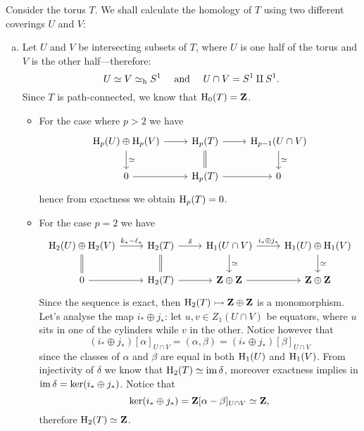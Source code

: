 \begin{example}[Torus]
\label{exp:torus-homology}
Consider the torus \(T\). We shall calculate the homology of \(T\) using two
different coverings \(U\) and \(V\):
\begin{enumerate}[(a)]\setlength\itemsep{0em}
\item Let \(U\) and \(V\) be intersecting subsets of \(T\), where \(U\) is one
  half of the torus and \(V\) is the other half---therefore:
  \[
  U \simeq V \simeq_{\text{h}} S^1 \quad \text{ and } \quad U \cap V = S^1 \amalg S^1.
  \]
  Since \(T\) is path-connected, we know that \(\operatorname{H}_0(T) = \mathbf{Z}\).
  \begin{itemize}\setlength\itemsep{0em}
\item For the case where \(p > 2\) we have
  \[
  \begin{tikzcd}
  \Hmlg_p(U) \oplus \Hmlg_p(V) \ar[d, "\dis"]
  \ar[r]
  &\Hmlg_p(T) \ar[d, equals]
  \ar[r]
  &\Hmlg_{p-1}(U \cap V) \ar[d, "\dis"]
  \\
  0 \ar[r] &\Hmlg_p(T) \ar[r] &0
  \end{tikzcd}
  \]
  hence from exactness we obtain \(\operatorname{H}_p(T) = 0\).

  \item For the case \(p = 2\) we have
  \[
  \begin{tikzcd}
  \Hmlg_2(U) \oplus \Hmlg_2(V)
  \ar[r, "k_{*} - \ell_{*}"]
  \ar[d, equals]
  &\Hmlg_2(T)
  \ar[r, "\delta"]
  \ar[d, equals]
  &\Hmlg_1(U \cap V)
  \ar[d, "\dis"]
  \ar[r, "i_{*} \oplus j_{*}"]
  &\Hmlg_1(U) \oplus \Hmlg_1(V)
  \ar[d, "\dis"]
  \\
  0 \ar[r] &\Hmlg_2(T) \ar[r] &\Z \oplus \Z \ar[r] &\Z \oplus \Z
  \end{tikzcd}
  \]
  Since the sequence is exact, then \(\operatorname{H}_2(T) \rightarrowtail \mathbf{Z} \oplus \mathbf{Z}\) is a
  monomorphism. Let's analyse the map \(i_{*} \oplus j_{*}\): let
  \(u, v \in Z_1(U \cap V)\) be equators, where \(u\) sits in one of the cylinders
  while \(v\) in the other. Notice however that
  \[
  (i_{*} \oplus j_{*})[\alpha]_{U \cap V} = (\alpha, \beta) = (i_{*} \oplus j_{*})[\beta]_{U \cap V}
  \]
  since the classes of \(\alpha\) and \(\beta\) are equal in both \(\operatorname{H}_1(U)\) and
  \(\operatorname{H}_1(V)\). From injectivity of \(\delta\) we know that
  \(\operatorname{H}_2(T) \simeq \operatorname{im} \delta\), moreover exactness implies in
  \(\operatorname{im} \delta = \ker(i_{*} \oplus j_{*})\). Notice that
  \[
  \ker(i_{*} \oplus j_{*}) = \mathbf{Z}[\alpha - \beta]_{U \cap V} \simeq \mathbf{Z},
  \]
  therefore \(\operatorname{H}_2(T) \simeq \mathbf{Z}\).


\end{itemize}
\end{enumerate}
\end{example}
